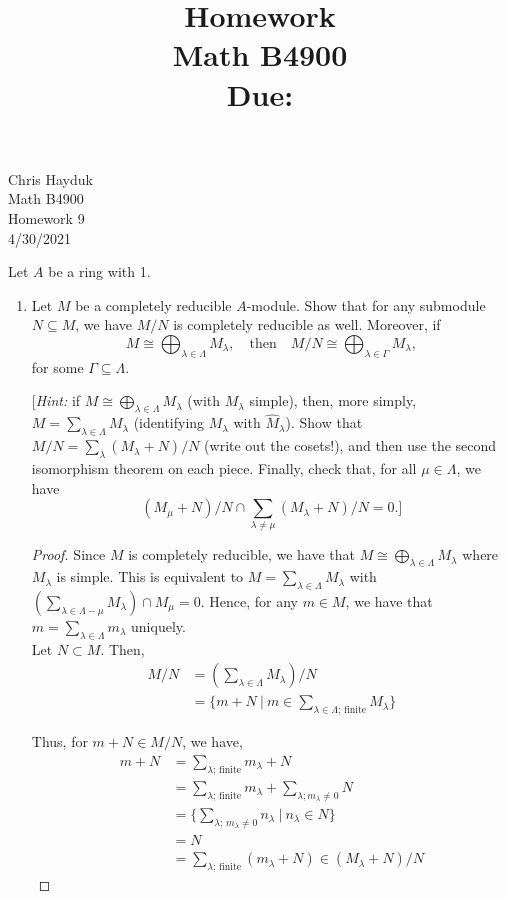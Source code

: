 \documentclass[11pt, reqno]{amsart}
\title[Homework \HW]{Homework \HW \\
Math B4900\\
\small Due: \DUE}
\author{}
\theoremstyle{plain}
\theoremstyle{definition}
\theoremstyle{example}
\def\HW{9}
\def\DUE{4/30/2021}
\begin{document}
\begin{flushright}
Chris Hayduk\\
Math B4900\\
Homework \HW\\
\DUE
\end{flushright}


Let $A$ be a ring with 1.
\begin{enumerate}[1.]
\item Let $M$ be a completely reducible $A$-module. Show that for any submodule $N \subseteq M$, we have $M/N$ is completely reducible as well. Moreover, if 
$$M \cong \bigoplus_{\lambda \in \Lambda}M_\lambda, \quad \text{then} \quad 
	M/N \cong \bigoplus_{\lambda \in \Gamma}M_\lambda,$$
	for some $\Gamma \subseteq \Lambda$.

{[\emph{Hint:} if $M \cong \bigoplus_{\lambda \in \Lambda}M_\lambda$ (with $M_\lambda$ simple), then, more simply, $M = \sum_{\lambda \in \Lambda} M_\lambda$ (identifying $M_\lambda$ with $\hat{M}_\lambda$). Show that $M/N = \sum_\lambda (M_\lambda + N)/N$ (write out the cosets!), and then use the second isomorphism theorem on each piece. Finally, check that, for all $\mu \in \Lambda$, we have 
$$(M_\mu +N)/N \cap \sum_{\lambda \neq \mu} (M_\lambda + N)/N = 0.]$$}

\begin{proof}
Since $M$ is completely reducible, we have that $M \cong \bigoplus_{\lambda \in \Lambda}M_\lambda$ where $M_{\lambda}$ is simple. This is equivalent to $M = \sum_{\lambda \in \Lambda} M_{\lambda}$ with $\left(\sum_{\lambda \in \Lambda - \mu} M_{\lambda} \right) \cap M_{\mu} = 0$. Hence, for any $m \in M$, we have that $m = \sum_{\lambda \in \Lambda} m_{\lambda}$ uniquely.\\

Let $N \subset M$. Then,
\begin{align*}
M/N &= \left(\sum_{\lambda \in \Lambda} M_{\lambda} \right)/N\\
&= \{m + N \ | \ m \in \sum_{\lambda \in \Lambda \text{; finite}} M_{\lambda}\}
\end{align*}

Thus, for $m + N \in M/N$, we have,
\begin{align*}
m + N &= \sum_{\lambda \text{; finite}} m_{\lambda} + N\\
&= \sum_{\lambda \text{; finite}} m_{\lambda} + \sum_{\lambda; m_{\lambda} \neq 0} N\\
&= \{\sum_{\lambda \text{; } m_{\lambda} \neq 0} n_{\lambda} \ | \ n_{\lambda} \in N\}\\
&= N\\
&= \sum_{\lambda \text{; finite}} (m_{\lambda} + N) \in (M_{\lambda} + N)/N
\end{align*}


\end{proof}
\end{enumerate}
\end{document}
